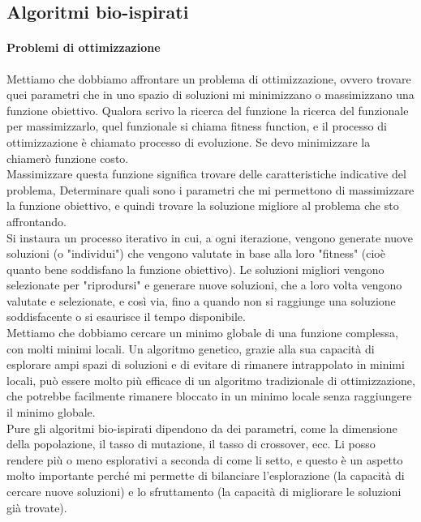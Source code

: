 \subsection{Algoritmi bio-ispirati}
\paragraph{Problemi di ottimizzazione}
Mettiamo che dobbiamo affrontare un problema di ottimizzazione, ovvero trovare 
quei parametri che in uno spazio di soluzioni mi minimizzano o massimizzano una funzione obiettivo.
Qualora scrivo la ricerca del funzione la ricerca del funzionale per massimizzarlo, quel funzionale
si chiama fitness function, e il processo di ottimizzazione è chiamato processo di evoluzione.
Se devo minimizzare la chiamerò funzione costo.\\

Massimizzare questa funzione significa trovare delle caratteristiche indicative del problema, 
Determinare quali sono i parametri che mi permettono di massimizzare la funzione obiettivo,
e quindi trovare la soluzione migliore al problema che sto affrontando.\\

Si instaura un processo iterativo in cui, a ogni iterazione, vengono generate nuove 
soluzioni (o "individui") che vengono valutate in base alla loro "fitness" 
(cioè quanto bene soddisfano la funzione obiettivo). Le soluzioni migliori vengono 
selezionate per "riprodursi" e generare nuove soluzioni, che a loro volta vengono 
valutate e selezionate, e così via, fino a quando non si raggiunge una soluzione 
soddisfacente o si esaurisce il tempo disponibile.\\

Mettiamo che dobbiamo cercare un minimo globale di una funzione complessa, 
con molti minimi locali. Un algoritmo genetico, grazie alla sua capacità di esplorare 
ampi spazi di soluzioni e di evitare di rimanere intrappolato in minimi locali, 
può essere molto più efficace di un algoritmo tradizionale di ottimizzazione, 
che potrebbe facilmente rimanere bloccato in un minimo locale senza raggiungere 
il minimo globale.\\

Pure gli algoritmi bio-ispirati dipendono da dei parametri, come la dimensione della
popolazione, il tasso di mutazione, il tasso di crossover, ecc. Li posso rendere più
o meno esplorativi a seconda di come li setto, e questo è un aspetto molto importante
perché mi permette di bilanciare l'esplorazione (la capacità di cercare nuove soluzioni)
e lo sfruttamento (la capacità di migliorare le soluzioni già trovate).\\

